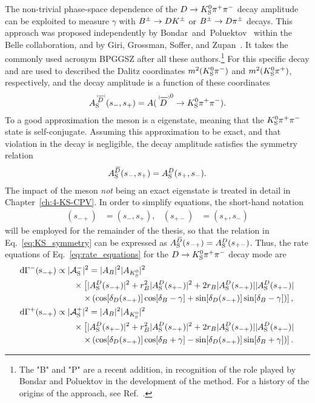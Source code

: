 The non-trivial phase-space dependence of the ${D}\rightarrow{\ensuremath{{K}^0_{\mathrm{S}}}}{\ensuremath{{\pi}^+}}{\ensuremath{{\pi}^-}}$ decay amplitude can be exploited to measure $\gamma$ with ${{B}^\pm}\rightarrow {\ensuremath{D}}{\ensuremath{{K}^\pm}}$ or ${{B}^\pm}\rightarrow {\ensuremath{D}}{\ensuremath{{\pi}^\pm}}$ decays. This approach was proposed independently by Bondar~and~Poluektov~\cite{BONDARGGSZ,BELLE2004} within the Belle collaboration, and by Giri, Grossman, Soffer, and Zupan~\cite{giriDeterminingGammaUsing2003}. It takes the commonly used acronym BPGGSZ after all these authors.\footnote{The "B" and "P" are a recent addition, in recognition of the role played by Bondar and Poluektov in the development of the method. For a history of the origins of the approach, see Ref.~\cite{ceccucciOriginsMethodDetermine2020}.} For this specific decay \sm and \sp are used to described the Dalitz coordinates $m^2({{K}^0_{\mathrm{S}}}{{\pi}^-})$ and $m^2({{K}^0_{\mathrm{S}}}{{\pi}^+})$, respectively, and the \D decay amplitude is a function of these coordinates
\begin{align}\label{eq:ADDb_definition}
\ADorDbS (\smpLong)= A(\DorDbar^0\to K^0_\text{S} \pi^+\pi^-).
\end{align}
To a good approximation the \KS meson is a \CP eigenstate, meaning that the ${{K}^0_{\mathrm{S}}}{{\pi}^+}{{\pi}^-}$ state is self-conjugate. Assuming this approximation to be exact, and that \CP violation in the \D decay is negligible, the \D decay amplitude satisfies the symmetry relation
\begin{align}\label{eq:KS_symmetry}
     A_{\rm S}^{{\kern 0.18em\overline{\kern -0.18em D}}}(s_-, s_+)=A_{\rm S}^{D}(s_+, s_-).
 \end{align} 
 The impact of the \KS meson \emph{not} being an exact \CP eigenstate is treated in detail in Chapter~\ref{ch:4-KS-CPV}. In order to simplify equations, the short-hand notation 
 \begin{align}
     (s_{-+})&=(s_-,s_+), &(s_{+-})&=(s_+,s_-)
 \end{align} will be employed for the remainder of the thesis, so that the relation in Eq.~\eqref{eq:KS_symmetry} can be expressed as $A_{\rm S}^{{\kern 0.18em\overline{\kern -0.18em D}}}(s_{-+})=A_{\rm S}^{D}(s_{+-})$. Thus, the rate equations of Eq.~\eqref{eq:rate_equations} for the ${D}\rightarrow{\ensuremath{{K}^0_{\mathrm{S}}}}{\ensuremath{{\pi}^+}}{\ensuremath{{\pi}^-}}$ decay mode are
 \begin{subequations}\label{eq:Gamma_Bminus}
\begin{align} 
    \rm {d} \Gamma^-(s_{-+}) &\propto |\mathcal{A}_{\rm S}^-|^2 = |A_{B}|^2|A_{{{K}^0_{\mathrm{S}}}}|^2 \notag \\
    &\qquad\times\left[|A_{\rm S}^{D}(s_{-+})|^2 + r_{B}^2 |A_{\rm S}^{D}(s_{+-})|^2 + 2r_{B} |A_{\rm S}^{D}(s_{-+})||A_{\rm S}^{D}(s_{+-})|\right .
    \notag \\
    &\quad\qquad \left. \times \left(\cos[\delta_D(s_{-+})]\cos[\delta_{B}-\gamma]+\sin[\delta_D(s_{-+})]\sin[\delta_{B}-\gamma]\right)\right], \\
    \rm {d} \Gamma^+(s_{-+}) &\propto |\mathcal{A}_{\rm S}^+|^2 = |A_{B}|^2|A_{{{K}^0_{\mathrm{S}}}}|^2 \notag \\
    &\qquad\times\left[|A_{\rm S}^{D}(s_{+-})|^2 + r_{B}^2 |A_{\rm S}^{D}(s_{-+})|^2 + 2r_{B} |A_{\rm S}^{D}(s_{-+})||A_{\rm S}^{D}(s_{+-})|\right .
    \notag \\
    &\quad\qquad \left. \times \left(\cos[\delta_D(s_{-+})]\cos[\delta_{B}+\gamma]-\sin[\delta_D(s_{-+})]\sin[\delta_{B}+\gamma]\right)\right].
\end{align}
\end{subequations}
